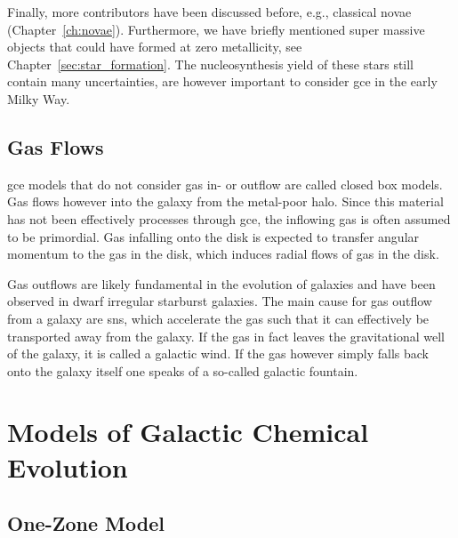 Finally, more contributors have been discussed before, e.g., classical novae (Chapter~\ref{ch:novae}). Furthermore, we have briefly mentioned super massive objects that could have formed at zero metallicity, see Chapter~\ref{sec:star_formation}. The nucleosynthesis yield of these stars still contain many uncertainties, are however important to consider \ac{gce} in the early Milky Way.

\subsection{Gas Flows}

\ac{gce} models that do not consider gas in- or outflow are called closed box models. Gas flows however into the galaxy from the metal-poor halo. Since this material has not been effectively processes through \ac{gce}, the inflowing gas is often assumed to be primordial. Gas infalling onto the disk is expected to transfer angular momentum to the gas in the disk, which induces radial flows of gas in the disk. 

Gas outflows are likely fundamental in the evolution of galaxies and have been observed in dwarf irregular starburst galaxies. The main cause for gas outflow from a galaxy are \acp{sn}, which accelerate the gas such that it can effectively be transported away from the galaxy. If the gas in fact leaves the gravitational well of the galaxy, it is called a galactic wind. If the gas however simply falls back onto the galaxy itself one speaks of a so-called galactic fountain.


\section{Models of Galactic Chemical Evolution}

\subsection{One-Zone Model}

